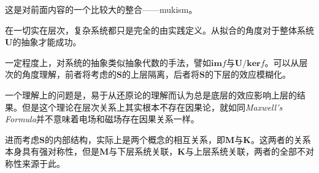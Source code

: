 \documentclass{ctexart}
\begin{document}
这是对前面内容的一个比较大的整合——mukism。

在一切实在层次，复杂系统都只是完全的由实践定义。从拟合的角度对于整体系统\textbf{U}的抽象才能成功。

一定程度上，对系统的抽象类似抽象代数的手法，譬如$\mathbf{im} f$与$\mathbf{U} / \mathbf{ker} f$。可以从层次的角度理解，前者将考虑的$\mathbf{S}$的上层隔离，后者将$\mathbf{S}$的下层的效应模糊化。

一个理解上的问题是，易于从还原论的理解而认为总是底层的效应影响上层的结果。但是这个理论在层次关系上其实根本不存在因果论，就如同\textit{Maxwell's Formula}并不意味着电场和磁场存在因果关系一样。

进而考虑$\mathbf{S}$的内部结构，实际上是两个概念的相互关系，即$\mathbf{M}$与$\mathbf{K}$。这两者的关系本身具有强对称性，但是$\mathbf{M}$与下层系统关联，$\mathbf{K}$与上层系统关联，两者的全部不对称性来源于此。
\end{document}

